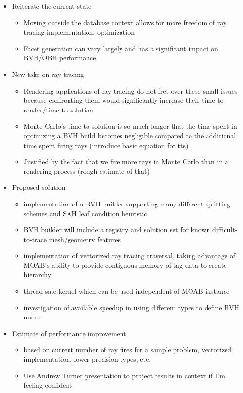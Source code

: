 \documentclass[10pt, a4paper]{article}
\begin{document}
\begin{itemize}
\item Reiterate the current state
  \begin{itemize}
  \item Moving outside the database context allows for more freedom of ray tracing implementation, optimization
  \item Facet generation can vary largely and has a significant impact on BVH/OBB performance
  \end{itemize}
\item New take on ray tracing
  \begin{itemize}
  \item Rendering applications of ray tracing do not fret over these small issues because confronting them would significantly increase their time to render/time to solution
  \item Monte Carlo's time to solution is so much longer that the time spent in optimizing a BVH build becomes negligible compared to the additional time spent firing rays (introduce basic equation for tts)
  \item Justified by the fact that we fire more rays in Monte Carlo than in a rendering process (rough estimate of that)
  \end{itemize}
\item Proposed solution
  \begin{itemize}
  \item implementation of a BVH builder supporting many different splitting schemes and SAH leaf condition heuristic
  \item BVH builder will include a registry and solution set for known difficult-to-trace mesh/geometry features
  \item implementation of vectorized ray tracing traversal, taking advantage of MOAB's ability to provide contiguous memory of tag data to create hierarchy
  \item thread-safe kernel which can be used independent of MOAB instance
  \item investigation of available speedup in using different types to define BVH nodes
  \end{itemize}
\item Estimate of performance improvement
  \begin{itemize}
  \item based on current number of ray fires for a sample problem, vectorized implementation, lower precision types, etc.
  \item Use Andrew Turner presentation to project results in context if I'm feeling confident
  \end{itemize}
\end{itemize}
\end{document}

